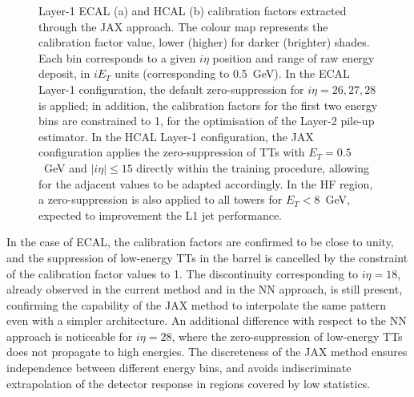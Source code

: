 \begin{figure} [h]
    \centering
    \caption{Layer-1 ECAL (a) and HCAL (b) calibration factors extracted through the JAX approach. The colour map represents the calibration factor value, lower (higher) for darker (brighter) shades. Each bin corresponds to a given $i\eta$ position and range of raw energy deposit, in $iE_T$ units (corresponding to 0.5~GeV). In the ECAL Layer-1 configuration, the default zero-suppression for $i\eta=26,27,28$ is applied; in addition, the calibration factors for the first two energy bins are constrained to 1, for the optimisation of the Layer-2 pile-up estimator. In the HCAL Layer-1 configuration, the JAX configuration applies the zero-suppression of TTs with $E_T=0.5$~GeV and $|i\eta|\leq15$ directly within the training procedure, allowing for the adjacent values to be adapted accordingly. In the HF region, a zero-suppression is also applied to all towers for $E_T<8$~GeV, expected to improvement the L1 jet performance.}
    \label{fig:JAX_SFs}
\end{figure}

In the case of ECAL, the calibration factors are confirmed to be close to unity, and the suppression of low-energy TTs in the barrel is cancelled by the constraint of the calibration factor values to 1. The discontinuity corresponding to $i\eta=18$, already observed in the current method and in the NN approach, is still present, confirming the capability of the JAX method to interpolate the same pattern even with a simpler architecture. 
An additional difference with respect to the NN approach is noticeable for $i\eta=28$, where the zero-suppression of low-energy TTs does not propagate to high energies.
The discreteness of the JAX method ensures independence between different energy bins, and avoids indiscriminate extrapolation of the detector response in regions covered by low statistics.


